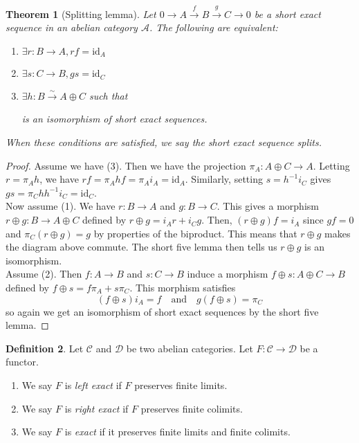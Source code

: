 \documentclass{article}
\newcommand{\id}{\mathrm{id}}
\newcommand{\cat}{\mathcal{C}}
\newcommand{\catt}{\mathcal{D}}
\newcommand{\Acat}{\mathcal{A}}
\theoremstyle{plain}
\newtheorem{theorem}{Theorem}[section]
\theoremstyle{definition}
\newtheorem{definition}[theorem]{Definition}
\theoremstyle{remark}
\begin{document}
\begin{theorem}[Splitting lemma]
    Let $0 \to A \xrightarrow{f} B \xrightarrow{g} C \to 0$ be a short exact sequence in an abelian category $\Acat$. The following are equivalent:
    \begin{enumerate}
        \item[(1)] $\exists r : B \to A, rf = \id_A$ 
        \item[(2)] $\exists s : C \to B, gs = \id_C$
        \item[(3)] $\exists h : B \xrightarrow{\sim} A \oplus C$ such that
        \begin{center}
        \end{center}
        is an isomorphism of short exact sequences.
    \end{enumerate}
    When these conditions are satisfied, we say the short exact sequence \emph{splits}.
\end{theorem}

\begin{proof}
    Assume we have (3). Then we have the projection $\pi_A : A \oplus C \to A$. Letting $r = \pi_A h$, we have $rf = \pi_A h f = \pi_A i_A = \id_A$. Similarly, setting $s = h^{-1} i_C$ gives $gs = \pi_C h h^{-1} i_C = \id_C$. \\
    Now assume (1). We have $r : B \to A$ and $g : B \to C$. This gives a morphism $r \oplus g : B \to A \oplus C$ defined by $r \oplus g = i_A r + i_C g$. Then, $(r \oplus g)f = i_A$ since $gf = 0$ and $\pi_C (r \oplus g) = g$ by properties of the biproduct. This means that $r\oplus g$ makes the diagram above commute. The short five lemma then tells us $r\oplus g$ is an isomorphism. \\
    Assume (2). Then $f : A \to B$ and $s : C \to B$ induce a morphism $f \oplus s : A \oplus C \to B$ defined by $f \oplus s = f \pi_A + s \pi_C$. This morphism satisfies
    \[(f\oplus s)i_A = f \quad \text{and} \quad g (f\oplus s) = \pi_C\]
    so again we get an isomorphism of short exact sequences by the short five lemma.
\end{proof}

\begin{definition}
    Let $\cat$ and $\catt$ be two abelian categories. Let $F : \cat \to \catt$ be a functor.
    \begin{enumerate}
        \item We say $F$ is \emph{left exact} if $F$ preserves finite limits.
        \item We say $F$ is \emph{right exact} if $F$ preserves finite colimits.
        \item We say $F$ is \emph{exact} if it preserves finite limits and finite colimits.
    \end{enumerate}
\end{definition}
\end{document}

